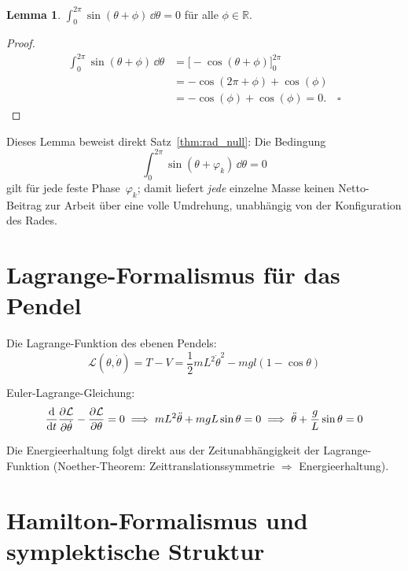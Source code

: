 ﻿\documentclass[12pt, a4paper]{report}
\theoremstyle{definition}
\newtheorem{lemma}[theorem]{Lemma}
\theoremstyle{remark}
\begin{document}
\begin{lemma}
  \label{lem:sin_integral}
  $\displaystyle\int_0^{2\pi} \sin(\theta + \phi)\,\dd\theta = 0$ für alle $\phi \in \mathbb{R}$.
\end{lemma}

\begin{proof}
  \begin{align*}
    \int_0^{2\pi}\sin(\theta+\phi)\,\dd\theta
      &= \bigl[-\cos(\theta+\phi)\bigr]_0^{2\pi} \\
      &= -\cos(2\pi+\phi) + \cos(\phi) \\
      &= -\cos(\phi)+\cos(\phi) = 0. \quad\square
  \end{align*}
\end{proof}

Dieses Lemma beweist direkt Satz~\ref{thm:rad_null}: Die Bedingung
\begin{equation*}
  \int_0^{2\pi}\sin(\theta+\varphi_k)\,\dd\theta = 0
\end{equation*}
gilt für jede feste Phase~$\varphi_k$; damit liefert \emph{jede} einzelne Masse
keinen Netto-Beitrag zur Arbeit über eine volle Umdrehung, unabhängig von der
Konfiguration des Rades.

\section{Lagrange-Formalismus für das Pendel}

Die Lagrange-Funktion des ebenen Pendels:
\begin{equation}
  \mathcal{L}(\theta, \dot\theta) = T - V
  = \frac{1}{2}mL^2\dot\theta^2 - mgl(1 - \cos\theta)
\end{equation}

Euler-Lagrange-Gleichung:
\begin{equation}
  \dv{}{t}\pdv{\mathcal{L}}{\dot\theta} - \pdv{\mathcal{L}}{\theta} = 0
  \implies mL^2\ddot\theta + mgL\sin\theta = 0
  \implies \ddot\theta + \frac{g}{L}\sin\theta = 0
\end{equation}

Die Energieerhaltung folgt direkt aus der Zeitunabhängigkeit der Lagrange-Funktion
(Noether-Theorem: Zeittranslationssymmetrie $\Rightarrow$ Energieerhaltung).

\section{Hamilton-Formalismus und symplektische Struktur}
\end{document}

